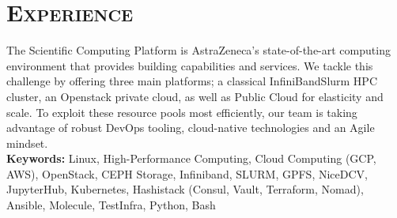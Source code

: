 \section{\textsc{Experience}}
{
The Scientific Computing Platform is AstraZeneca’s state-of-the-art computing environment that provides building capabilities and services. We tackle this challenge by offering three main platforms; a classical InfiniBandSlurm HPC cluster, an Openstack private cloud, as well as Public Cloud for elasticity and scale. To exploit these resource pools most efficiently, our team is taking advantage of robust DevOps tooling, cloud-native technologies and an Agile mindset.
\medskip\\ 
\textbf{Keywords:} Linux, High-Performance Computing, Cloud Computing (GCP, AWS), OpenStack, CEPH Storage, Infiniband, SLURM, GPFS, NiceDCV, JupyterHub, Kubernetes, Hashistack (Consul, Vault, Terraform, Nomad), Ansible, Molecule, TestInfra, Python, Bash\medskip}

